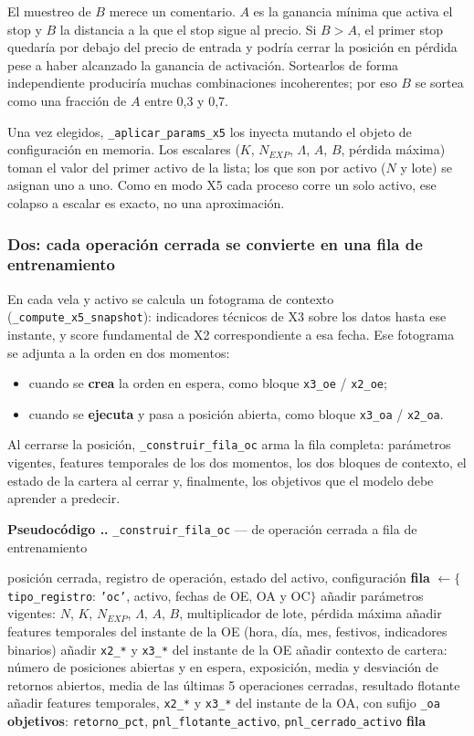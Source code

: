 \documentclass[11pt,a4paper]{article}
\newcommand{\code}[1]{\texttt{\small #1}}
\newcounter{pcode}[section]
\renewcommand{\thepcode}{\thesection.\arabic{pcode}}
\newenvironment{pseudo}[1]{%
  \par\medskip\noindent
  \refstepcounter{pcode}%
  \colorbox{cfondo}{\parbox{\dimexpr\linewidth-2\fboxsep\relax}{%
    \small\textbf{\textcolor{cazul}{Pseudocódigo \thepcode.}} #1}}%
  \par\nobreak\smallskip\begin{algorithmic}[1]%
}{\end{algorithmic}\par\medskip}
\newcommand{\bigsep}{\par\vspace{3pt}}
\begin{document}
\bigsep
El muestreo de $B$ merece un comentario. $A$ es la ganancia mínima que activa el stop y $B$ la
distancia a la que el stop sigue al precio. Si $B > A$, el primer stop quedaría por debajo
del precio de entrada y podría cerrar la posición en pérdida pese a haber alcanzado la
ganancia de activación. Sortearlos de forma independiente produciría muchas combinaciones
incoherentes; por eso $B$ se sortea como una fracción de $A$ entre 0,3 y 0,7.

\bigsep
Una vez elegidos, \code{_aplicar_params_x5} los inyecta mutando el objeto de configuración
en memoria. Los escalares ($K$, $N_{EXP}$, $\Lambda$, $A$, $B$, pérdida máxima) toman el
valor del primer activo de la lista; los que son por activo ($N$ y lote) se asignan uno a
uno. Como en modo X5 cada proceso corre un solo activo, ese colapso a escalar es exacto, no
una aproximación.

\subsubsection{Dos: cada operación cerrada se convierte en una fila de entrenamiento}

En cada vela y activo se calcula un fotograma de contexto (\code{_compute_x5_snapshot}):
indicadores técnicos de X3 sobre los datos hasta ese instante, y score fundamental de X2
correspondiente a esa fecha. Ese fotograma se adjunta a la orden en dos momentos:

\begin{itemize}[leftmargin=1.4em,itemsep=2pt]
\item cuando se \textbf{crea} la orden en espera, como bloque \code{x3_oe} / \code{x2_oe};
\item cuando se \textbf{ejecuta} y pasa a posición abierta, como bloque \code{x3_oa} /
\code{x2_oa}.
\end{itemize}

\bigsep
Al cerrarse la posición, \code{_construir_fila_oc} arma la fila completa: parámetros
vigentes, features temporales de los dos momentos, los dos bloques de contexto, el estado de
la cartera al cerrar y, finalmente, los objetivos que el modelo debe aprender a predecir.

\begin{pseudo}{\code{_construir_fila_oc} — de operación cerrada a fila de entrenamiento}
\Require posición cerrada, registro de operación, estado del activo, configuración
\State \textbf{fila} $\gets \{$\code{tipo_registro}: \code{'oc'}, activo, fechas de OE, OA y OC$\}$
\State añadir parámetros vigentes: $N$, $K$, $N_{EXP}$, $\Lambda$, $A$, $B$, multiplicador de lote, pérdida máxima
\State añadir features temporales del instante de la OE (hora, día, mes, festivos, indicadores binarios)
\State añadir \code{x2_*} y \code{x3_*} del instante de la OE
\State añadir contexto de cartera: número de posiciones abiertas y en espera, exposición, media y desviación de retornos abiertos, media de las últimas 5 operaciones cerradas, resultado flotante
\State añadir features temporales, \code{x2_*} y \code{x3_*} del instante de la OA, con sufijo \code{_oa}
\State \textbf{objetivos}: \code{retorno_pct}, \code{pnl_flotante_activo}, \code{pnl_cerrado_activo}
\State \Return \textbf{fila}
\end{pseudo}
\end{document}
